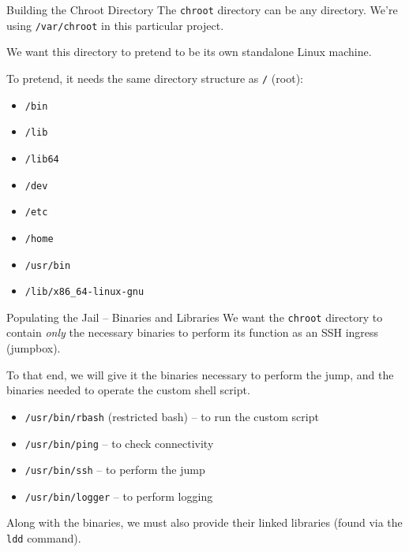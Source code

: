 \documentclass[14pt,compress,dvipsnames,aspectratio=169]{beamer} %
\begin{document}
\begin{frame}{Building the Chroot Directory}
    The \texttt{chroot} directory can be any directory. We're using
    \texttt{/var/chroot} in this particular project.

    We want this directory to pretend to be its own standalone Linux machine.  

    To pretend, it needs the same directory structure as \texttt{/} (root):  
    \begin{itemize}
        \item{\texttt{/bin}} 
        \item{\texttt{/lib}} 
        \item{\texttt{/lib64}} 
        \item{\texttt{/dev}} 
        \item{\texttt{/etc}} 
        \item{\texttt{/home}} 
        \item{\texttt{/usr/bin}} 
        \item{\texttt{/lib/x86\_64-linux-gnu}} 
    \end{itemize}
\end{frame}


\begin{frame}{Populating the Jail -- Binaries and Libraries}
    We want the \texttt{chroot} directory to contain \textit{only} the necessary
    binaries to perform its function as an SSH ingress (jumpbox).  

    To that end, we will give it the binaries necessary to perform the jump, and the
    binaries needed to operate the custom shell script.  
    \begin{itemize}
        \item{\texttt{/usr/bin/rbash} (restricted bash) -- to run the custom script} 
        \item{\texttt{/usr/bin/ping} -- to check connectivity} 
        \item{\texttt{/usr/bin/ssh} -- to perform the jump} 
        \item{\texttt{/usr/bin/logger} -- to perform logging} 
    \end{itemize}
    Along with the binaries, we must also provide their linked libraries (found via
    the \texttt{ldd} command).  
\end{frame}
\end{document}
